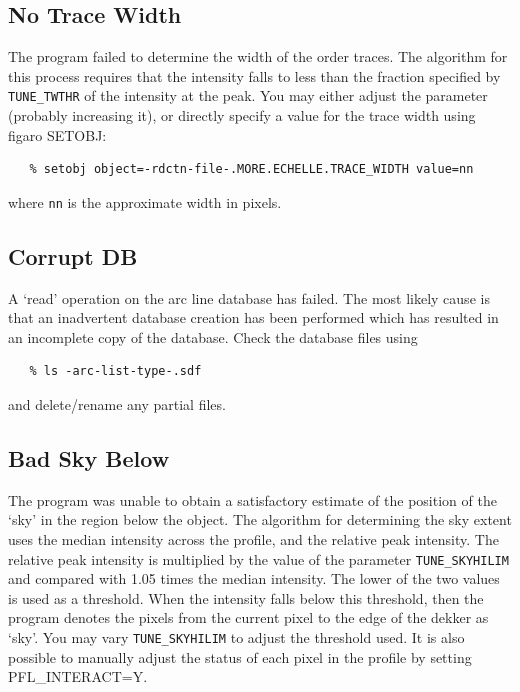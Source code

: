 \documentclass[11pt,twoside]{article}
\newcommand{\xref}[3]{#1}
\newcommand{\xlabel}[1]{}
\newcommand{\mlabel}[1]{\xlabel{#1}\label{#1}}
\newcommand{\myindex}[1]{\index{#1}}
\renewcommand{\myindex}[1]{}
\begin{document}
\subsection{\mlabel{no_trace_width} No Trace Width}

The program failed to determine the width of the order traces. The
algorithm for this process requires that the intensity falls to less
than the fraction specified by \texttt{TUNE\_TWTHR} of the intensity at the
peak.  You may either adjust the parameter (probably increasing it),
or directly specify a value for the trace width using
\xref{{\sc figaro} SETOBJ}{sun86}{SETOBJ}:

\begin{verbatim}
   % setobj object=-rdctn-file-.MORE.ECHELLE.TRACE_WIDTH value=nn
\end{verbatim}

where {\tt nn} is the approximate width in pixels.


\subsection{\mlabel{corrupt_db} Corrupt DB}

A `read' operation on the arc line database has failed. The most likely
cause is that an inadvertent database creation has been performed which
has resulted in an incomplete copy of the database.  Check the database
files using

\begin{verbatim}
   % ls -arc-list-type-.sdf
\end{verbatim}

and delete/rename any partial files.

\subsection{\mlabel{bad_sky_below} Bad Sky Below}
\myindex{Object limits!failure}

The program was unable to obtain a satisfactory estimate of the position
of the `sky' in the region below the object. The algorithm for
determining the sky extent uses the median intensity across the profile,
and the relative peak intensity. The relative peak intensity is
multiplied by the value of the parameter \texttt{TUNE\_SKYHILIM} and compared
with 1.05 times the median intensity. The lower of the two values is used as
a threshold. When the intensity falls below this threshold,  then the
program denotes the pixels from the current pixel to the edge of the
dekker as `sky'.  You may vary \texttt{TUNE\_SKYHILIM} to adjust the
threshold used. It is also possible to manually adjust the status of
each pixel in the profile by setting PFL\_INTERACT=Y.
\end{document}
